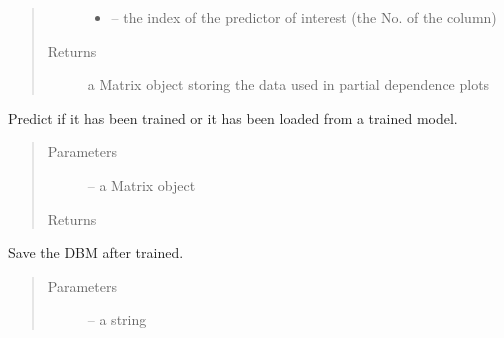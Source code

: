\documentclass[letterpaper,10pt,english]{sphinxmanual}
\begin{document}
\begin{fulllineitems}
\begin{fulllineitems}
\begin{quote}
\begin{description}
\begin{itemize}
\item {} 
 -- the index of the predictor of interest (the No. of the column)

\end{itemize}

\item[{Returns}] \leavevmode
a Matrix object storing the data used in partial dependence plots

\end{description}\end{quote}

\end{fulllineitems}


\begin{fulllineitems}
\label{\detokenize{index:dbm_py.interface.AUTO_DBM.predict}}
Predict if it has been trained or it has been loaded from a trained model.
\begin{quote}\begin{description}
\item[{Parameters}] \leavevmode
{} -- a Matrix object

\item[{Returns}] \leavevmode


\end{description}\end{quote}

\end{fulllineitems}


\begin{fulllineitems}
\label{\detokenize{index:dbm_py.interface.AUTO_DBM.save}}
Save the DBM after trained.
\begin{quote}\begin{description}
\item[{Parameters}] \leavevmode
{} -- a string

\end{description}\end{quote}

\end{fulllineitems}



\end{fulllineitems}
\end{document}

